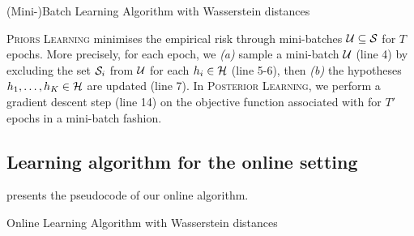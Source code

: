 \documentclass{article}
\begin{document}
\begin{algorithm}[H]
\caption{(Mini-)Batch Learning Algorithm with Wasserstein distances}\label{alg:batch}
\begin{algorithmic}[1]

\EndFor
\EndFor
\EndFor
{}
\EndProcedure
\State{}

\EndFor
\EndFor
{}
\EndProcedure
\end{algorithmic}
\end{algorithm}

\textsc{Priors Learning} minimises the empirical risk through mini-batches $\Ucal\subseteq\S$ for $T$ epochs. More precisely, for each epoch, we {\it (a)} sample a mini-batch $\Ucal$ (line 4) by excluding the set $\S_i$ from $\Ucal$ for each $h_i\in\H$ (line 5-6), then {\it (b)} the hypotheses $h_1,\dots,h_K\in\H$ are updated (line 7).
In \textsc{Posterior Learning}, we perform a gradient descent step (line 14) on the objective function associated with  for $T'$ epochs in a mini-batch fashion.

\subsection{Learning algorithm for the online setting}
\label{sec:alg-online}

 presents the pseudocode of our online algorithm.

\begin{algorithm}[H]
\caption{Online Learning Algorithm with Wasserstein distances}\label{alg:online}
\begin{algorithmic}[1]
\EndFor
\EndFor
{}
\end{algorithmic}
\end{algorithm}
\end{document}
